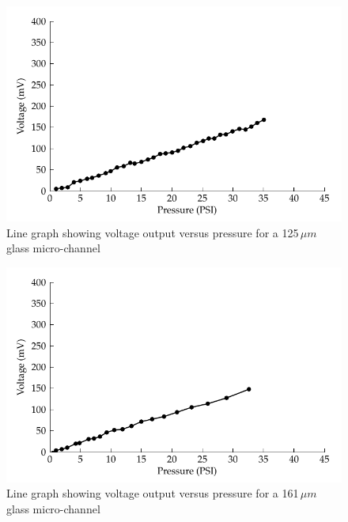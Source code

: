 \begin{figure}
\begin{centering}
\includegraphics{content/appendices/streamingCellMeasurements/graphics/streamingCell_voltVsPress_125um_out}
\par\end{centering}

\protect\caption{Line graph showing voltage output versus pressure for a 125$\,\mu m$
glass micro-channel}
\end{figure}
\begin{figure}
\begin{centering}
\includegraphics{content/appendices/streamingCellMeasurements/graphics/streamingCell_voltVsPress_161um_out}
\par\end{centering}

\protect\caption{Line graph showing voltage output versus pressure for a 161$\,\mu m$
glass micro-channel}
\end{figure}
